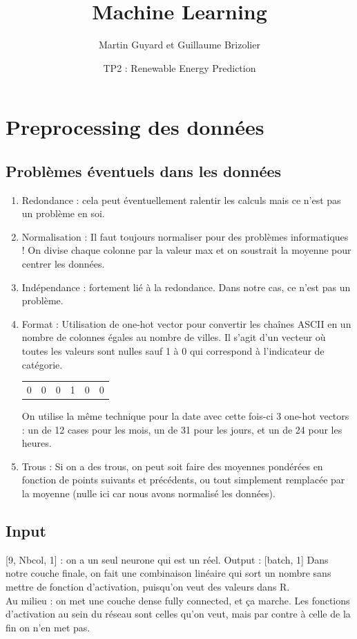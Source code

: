 \documentclass{article}
\title{Machine Learning}
\author{Martin Guyard et Guillaume Brizolier}
\date{TP2 : Renewable Energy Prediction}
\begin{document}
\maketitle

\section{Preprocessing des données}
\subsection{Problèmes éventuels dans les données}
\begin{enumerate}
    \item Redondance : cela peut éventuellement ralentir les calculs mais ce n'est pas un problème en soi.
    \item Normalisation : Il faut toujours normaliser pour des problèmes informatiques ! On divise chaque colonne par la valeur max et on soustrait la moyenne pour centrer les données.
    \item Indépendance : fortement lié à la redondance. Dans notre cas, ce n'est pas un problème.
    \item Format : Utilisation de one-hot vector pour convertir les chaînes ASCII en un nombre de colonnes égales au nombre de villes. Il s'agit d'un vecteur où toutes les valeurs sont nulles sauf 1 à 0 qui correspond à l'indicateur de catégorie.
    
     \begin{center}
    \begin{tabular}{c|c|c|c|c|c}
        0 & 0 & 0 & 1 & 0 & 0  \\
    \end{tabular}
    \end{center}
    On utilise la même technique pour la date avec cette fois-ci 3 one-hot vectors : un de 12 cases pour les mois, un de 31 pour les jours, et un de 24 pour les heures.
    \item Trous : Si on a des trous, on peut soit faire des moyennes pondérées en fonction de points suivants et précédents, ou tout simplement remplacée par la moyenne (nulle ici car nous avons normalisé les données).\\
    \end{enumerate}
    \subsection{Input}
    [9, Nbcol, 1] : on a un seul neurone qui est un réel.
    Output : [batch, 1]
    Dans notre couche finale, on fait une combinaison linéaire qui sort un nombre sans mettre de fonction d'activation, puisqu'on veut des valeurs dans R.\\
    Au milieu : on met une couche dense fully connected, et ça marche. Les fonctions d'activation au sein du réseau sont celles qu'on veut, mais par contre à celle de la fin on n'en met pas.
\end{document}
